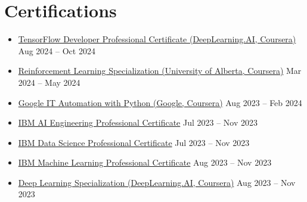 \section*{Certifications}
\begin{itemize}
    \itemsep0em
    \item \href{https://coursera.org/share/0303786ebfb376c8c67fc7f9c3af14a4}{TensorFlow Developer Professional Certificate (DeepLearning.AI, Coursera)} \hfill Aug 2024 -- Oct 2024
    \item \href{https://coursera.org/share/5360f415cf7616da410084059e3bb31a}{Reinforcement Learning Specialization (University of Alberta, Coursera)} \hfill Mar 2024 -- May 2024
    \item \href{https://coursera.org/share/41aaa60812a27a23cd6b35c4d035a933}{Google IT Automation with Python (Google, Coursera)} \hfill Aug 2023 -- Feb 2024
    \item \href{https://coursera.org/share/2cec23adffb2c7041f9b84fe34e226d6}{IBM AI Engineering Professional Certificate} \hfill Jul 2023 -- Nov 2023
    \item \href{https://coursera.org/share/b23a8d7904b01ee98299b31c0db18b9f}{IBM Data Science Professional Certificate} \hfill Jul 2023 -- Nov 2023
    \item \href{https://coursera.org/share/5a3fe4887b6105e8cae81dfeb1067ee5}{IBM Machine Learning Professional Certificate} \hfill Aug 2023 -- Nov 2023
    \item \href{https://coursera.org/share/483a4f1431dacdf4c2c279b29fde1627}{Deep Learning Specialization (DeepLearning.AI, Coursera)} \hfill Aug 2023 -- Nov 2023
\end{itemize}
